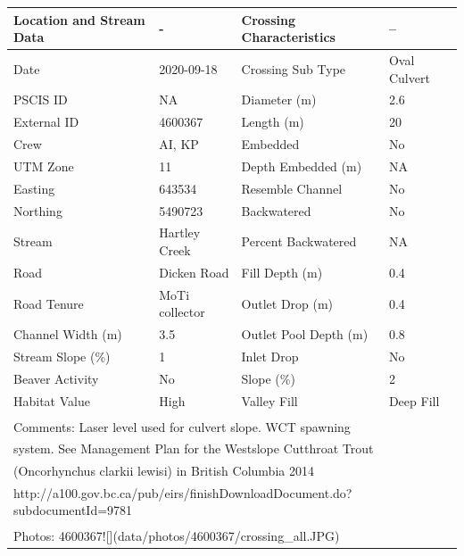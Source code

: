 \documentclass[
]{book}
\begin{document}
\begin{tabular}{llll}
\toprule
Location and Stream Data & - & Crossing Characteristics & --\\
\midrule
Date & 2020-09-18 & Crossing Sub Type & Oval Culvert\\
PSCIS ID & NA & Diameter (m) & 2.6\\
External ID & 4600367 & Length (m) & 20\\
Crew & AI, KP & Embedded & No\\
UTM Zone & 11 & Depth Embedded (m) & NA\\
\addlinespace
Easting & 643534 & Resemble Channel & No\\
Northing & 5490723 & Backwatered & No\\
Stream & Hartley Creek & Percent Backwatered & NA\\
Road & Dicken Road & Fill Depth (m) & 0.4\\
Road Tenure & MoTi collector & Outlet Drop (m) & 0.4\\
\addlinespace
Channel Width (m) & 3.5 & Outlet Pool Depth (m) & 0.8\\
Stream Slope (\%) & 1 & Inlet Drop & No\\
Beaver Activity & No & Slope (\%) & 2\\
Habitat Value & High & Valley Fill & Deep Fill\\
\bottomrule
\multicolumn{4}{l}{\textsuperscript{} Comments: Laser level used for culvert slope. WCT spawning}\\
\multicolumn{4}{l}{system. See Management Plan for the Westslope Cutthroat Trout}\\
\multicolumn{4}{l}{(Oncorhynchus clarkii lewisi) in British Columbia 2014}\\
\multicolumn{4}{l}{http://a100.gov.bc.ca/pub/eirs/finishDownloadDocument.do?subdocumentId=9781}\\
\multicolumn{4}{l}{\textsuperscript{} Photos: 4600367![](data/photos/4600367/crossing\_all.JPG)}\\
\end{tabular}
\end{document}
